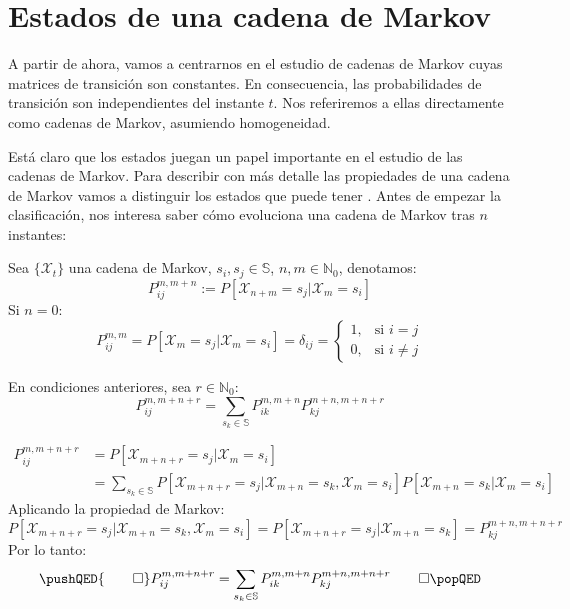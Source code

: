 \section{Estados de una cadena de Markov}
A partir de ahora, vamos a centrarnos en el estudio de cadenas de Markov cuyas matrices de transición son constantes. En consecuencia, las probabilidades de transición son independientes del instante $t$. Nos referiremos a ellas directamente como cadenas de Markov, asumiendo homogeneidad. 

Está claro que los estados juegan un papel importante en el estudio de las cadenas de Markov. Para describir con más detalle las propiedades de una cadena de Markov vamos a distinguir los estados que puede tener \cite{Barbosa}. Antes de empezar la clasificación, nos interesa saber cómo evoluciona una cadena de Markov tras $n$ instantes:


\begin{definition}
Sea $\{\mathcal{X}_t\}$ una cadena de Markov, $s_i, s_j \in \mathbb{S}$, $n,m\in\mathbb{N}_0$, denotamos:
\[P_{ij}^{m,m+n}:=P[\mathcal{X}_{n+m}=s_j|\mathcal{X}_m=s_i]\]
Si $n=0$:
\[P_{ij}^{m,m}=P[\mathcal{X}_{m}=s_j|\mathcal{X}_m=s_i]=\delta_{ij}=
\begin{cases}
    1, & \text{si } i=j\\
    0, &         \text{si } i\neq j
\end{cases}\]
\end{definition}
\begin{theorem}
En condiciones anteriores, sea $r\in \mathbb{N}_0$:
\[P_{ij}^{m,m+n+r}=\sum_{s_k\in\mathbb{S}}P_{ik}^{m,m+n}P_{kj}^{m+n,m+n+r}\]
\end{theorem}
\begin{proofs*}
    \[ 
    \begin{aligned}   
    P_{ij}^{m,m+n+r}&=P[\mathcal{X}_{m+n+r}=s_j|\mathcal{X}_m=s_i]\\
    &=\sum_{s_k\in\mathbb{S}} P[\mathcal{X}_{m+n+r}=s_j |\mathcal{X}_{m+n}=s_k,\mathcal{X}_m=s_i ] P[\mathcal{X}_{m+n}=s_k|\mathcal{X}_m=s_i ]
    \end{aligned} 
    \]
Aplicando la propiedad de Markov:
    \[P[\mathcal{X}_{m+n+r}=s_j |\mathcal{X}_{m+n}=s_k,\mathcal{X}_m=s_i ]=P[\mathcal{X}_{m+n+r}=s_j |\mathcal{X}_{m+n}=s_k]=P_{kj}^{m+n,m+n+r}\]
Por lo tanto:
    \[
    \pushQED{\qed}
    P_{ij}^{m,m+n+r}=\sum_{s_k\in\mathbb{S}}P_{ik}^{m,m+n}P_{kj}^{m+n,m+n+r}\qedhere
    \popQED\]
    
\end{proofs*}

